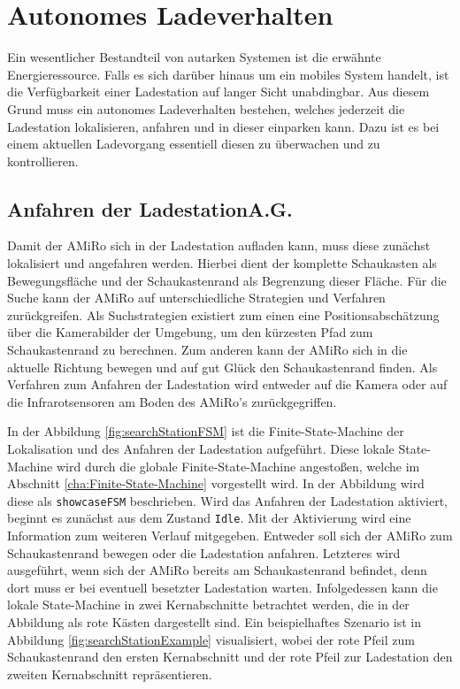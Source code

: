 \chapter{Autonomes Ladeverhalten} \label{kap:AutonomesLadeverhalten}
Ein wesentlicher Bestandteil von autarken Systemen ist die erwähnte Energieressource. Falls es sich darüber hinaus um ein mobiles System handelt, ist die Verfügbarkeit einer Ladestation auf langer Sicht unabdingbar. Aus diesem Grund muss ein autonomes Ladeverhalten bestehen, welches jederzeit die Ladestation lokalisieren, anfahren und in dieser einparken kann. Dazu ist es bei einem aktuellen Ladevorgang essentiell diesen zu überwachen und zu kontrollieren.

\section[Anfahren der Ladestation]{Anfahren der Ladestation\hfill {\normalsize A.G.}} \label{cha:Anfahren der Ladestation} %
Damit der AMiRo sich in der Ladestation aufladen kann, muss diese zunächst lokalisiert und angefahren werden. Hierbei dient der komplette Schaukasten als Bewegungsfläche und der Schaukastenrand als Begrenzung dieser Fläche. Für die Suche kann der AMiRo auf unterschiedliche Strategien und Verfahren zurückgreifen. Als Suchstrategien existiert zum einen eine Positionsabschätzung über die Kamerabilder der Umgebung, um den kürzesten Pfad zum Schaukastenrand zu berechnen. Zum anderen kann der AMiRo sich in die aktuelle Richtung bewegen und auf gut Glück den Schaukastenrand finden. Als Verfahren zum Anfahren der Ladestation wird entweder auf die Kamera oder auf die Infrarotsensoren am Boden des AMiRo's zurückgegriffen.

In der Abbildung \ref{fig:searchStationFSM} ist die Finite-State-Machine der Lokalisation und des Anfahren der Ladestation aufgeführt. Diese lokale State-Machine wird durch die globale Finite-State-Machine angestoßen, welche im Abschnitt \ref{cha:Finite-State-Machine} vorgestellt wird. In der Abbildung wird diese als \texttt{showcaseFSM} beschrieben. Wird das Anfahren der Ladestation aktiviert, beginnt es zunächst aus dem Zustand \texttt{Idle}. Mit der Aktivierung wird eine Information zum weiteren Verlauf mitgegeben. Entweder soll sich der AMiRo zum Schaukastenrand bewegen oder die Ladestation anfahren. Letzteres wird ausgeführt, wenn sich der AMiRo bereits am Schaukastenrand befindet, denn dort muss er bei eventuell besetzter Ladestation warten. Infolgedessen kann die lokale State-Machine in zwei Kernabschnitte betrachtet werden, die in der Abbildung als rote Kästen dargestellt sind. Ein beispielhaftes Szenario ist in Abbildung \ref{fig:searchStationExample} visualisiert, wobei der rote Pfeil zum Schaukastenrand den ersten Kernabschnitt und der rote Pfeil zur Ladestation den zweiten Kernabschnitt repräsentieren.

